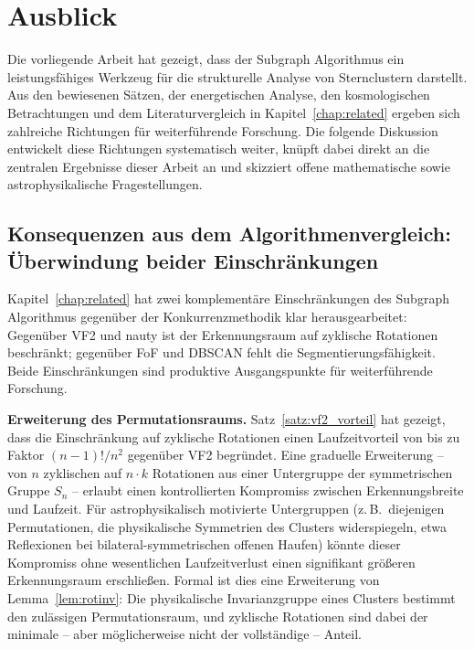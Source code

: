 ﻿\documentclass[a4paper,12pt]{report}
\theoremstyle{definition}
\begin{document}
\section{Ausblick}

Die vorliegende Arbeit hat gezeigt, dass der Subgraph Algorithmus ein leistungsfähiges Werkzeug für die strukturelle Analyse von Sternclustern darstellt. Aus den bewiesenen Sätzen, der energetischen Analyse, den kosmologischen Betrachtungen und dem Literaturvergleich in Kapitel~\ref{chap:related} ergeben sich zahlreiche Richtungen für weiterführende Forschung. Die folgende Diskussion entwickelt diese Richtungen systematisch weiter, knüpft dabei direkt an die zentralen Ergebnisse dieser Arbeit an und skizziert offene mathematische sowie astrophysikalische Fragestellungen.

\subsection{Konsequenzen aus dem Algorithmenvergleich: Überwindung beider Einschränkungen}
\label{ssec:ausblick_related}

Kapitel~\ref{chap:related} hat zwei komplementäre Einschränkungen des Subgraph Algorithmus gegenüber der Konkurrenzmethodik klar herausgearbeitet: Gegenüber VF2 und nauty ist der Erkennungsraum auf zyklische Rotationen beschränkt; gegenüber FoF und DBSCAN fehlt die Segmentierungsfähigkeit. Beide Einschränkungen sind produktive Ausgangspunkte für weiterführende Forschung.

\textbf{Erweiterung des Permutationsraums.} Satz~\ref{satz:vf2_vorteil} hat gezeigt, dass die Einschränkung auf zyklische Rotationen einen Laufzeitvorteil von bis zu Faktor $(n-1)!/n^2$ gegenüber VF2 begründet. Eine graduelle Erweiterung -- von $n$ zyklischen auf $n \cdot k$ Rotationen aus einer Untergruppe der symmetrischen Gruppe $S_n$ -- erlaubt einen kontrollierten Kompromiss zwischen Erkennungsbreite und Laufzeit. Für astrophysikalisch motivierte Untergruppen (z.\,B.\ diejenigen Permutationen, die physikalische Symmetrien des Clusters widerspiegeln, etwa Reflexionen bei bilateral-symmetrischen offenen Haufen) könnte dieser Kompromiss ohne wesentlichen Laufzeitverlust einen signifikant größeren Erkennungsraum erschließen. Formal ist dies eine Erweiterung von Lemma~\ref{lem:rotinv}: Die physikalische Invarianzgruppe eines Clusters bestimmt den zulässigen Permutationsraum, und zyklische Rotationen sind dabei der minimale -- aber möglicherweise nicht der vollständige -- Anteil.
\end{document}
